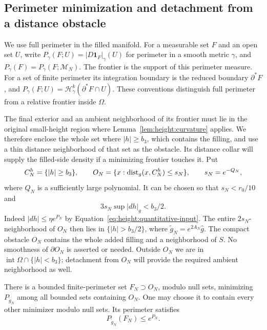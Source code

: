 \subsection{Perimeter minimization and detachment from a distance obstacle}

We use full perimeter in the filled manifold.  For a measurable set
$F$ and an open set $U$, write
$P_\gamma(F;U)=|D\mathbf1_F|_\gamma(U)$ for perimeter in a smooth
metric $\gamma$, and $P_\gamma(F)=P_\gamma(F;\mathcal M_N)$.
The frontier is the support of this perimeter measure.  For a set of
finite perimeter its integration boundary is the reduced boundary
$\partial^*F$, and
$P_\gamma(F;U)=\mathcal H^k_\gamma(\partial^*F\cap U)$.
These conventions distinguish full perimeter from a relative frontier
inside $\Omega$.

The final exterior and an ambient neighborhood of its frontier must
lie in the original small-height region where
Lemma~\ref{lem:height:curvature} applies. We therefore enclose the
whole set where $|h|\ge b_3$, which contains the filling, and use a
thin distance neighborhood of that set as the obstacle. Its distance
collar will supply the filled-side density if a minimizing frontier
touches it. Put
\begin{equation}\label{eq:height:obstacle}
 C_N^h=\{|h|\ge b_3\},\qquad
 O_N=\{x:\operatorname{dist}_g(x,C_N^h)\le s_N\},
 \qquad s_N=e^{-Q_N},
\end{equation}
where $Q_N$ is a sufficiently large polynomial.  It can be chosen so
that $s_N<r_0/10$ and
\begin{equation}\label{eq:height:plateau-neighborhood}
 3s_N\sup|dh|_g<b_3/2.
\end{equation}
Indeed $|dh|\le\eta e^{P_N}$ by
Equation~\eqref{eq:height:quantitative-input}.  The entire
$2s_N$-neighborhood of $O_N$ then lies in $\{|h|>b_3/2\}$, where
$\widetilde g_N=e^{2A_N}\widehat g$.  The compact obstacle $O_N$
contains the whole added filling and a neighborhood of $S$.
No smoothness of $\partial O_N$ is asserted or needed. Outside $O_N$
we are in $\operatorname{int}\Omega\cap\{|h|<b_3\}$; detachment from
$O_N$ will provide the required ambient neighborhood as well.

\begin{lemma}
\label{lem:height:BV-existence}
There is a bounded finite-perimeter set $F_N\supset O_N$, modulo null
sets, minimizing $P_{\widetilde g_N}$ among all bounded sets containing
$O_N$.  One may choose it to contain every other minimizer modulo null
sets.  Its perimeter satisfies
\begin{equation}\label{eq:height:competitor-bound}
 P_{\widetilde g_N}(F_N)\le e^{P_N}.
\end{equation}
\end{lemma}

